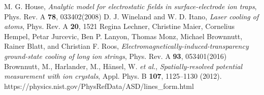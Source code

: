 \begin{thebibliography}{99}
	 M. G. House, \textit{Analytic model for electrostatic fields in surface-electrode ion traps}, Phys. Rev. A \textbf{78}, 033402(2008)
	 D. J. Wineland and W. D. Itano, \textit{Laser cooling of atoms}, Phys. Rev. A \textbf{20}, 1521
	 Regina Lechner, Christine Maier, Cornelius Hempel, Petar Jurcevic, Ben P. Lanyon, Thomas Monz, Michael Brownnutt, Rainer Blatt, and Christian F. Roos, \textit{Electromagnetically-induced-transparency ground-state cooling of long ion strings}, Phys. Rev. A \textbf{93}, 053401(2016)
	 Brownnutt, M., Harlander, M., Hänsel, W. \textit{et al.}, \textit{Spatially-resolved potential measurement with ion crystals}, Appl. Phys. B \textbf{107}, 1125–1130 (2012).
	 https://physics.nist.gov/PhysRefData/ASD/lines\_form.html
\end{thebibliography}
